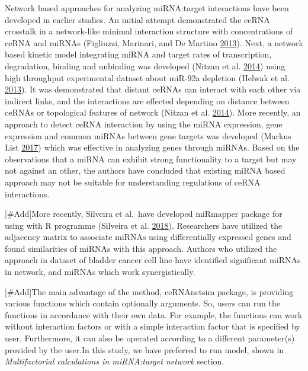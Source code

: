 \documentclass[a4,center,fleqn]{NAR}
\begin{document}
Network based approaches for analyzing miRNA:target interactions have
been developed in earlier studies. An initial attempt demonstrated the
ceRNA crosstalk in a network-like minimal interaction structure with
concentrations of ceRNA and miRNAs (Figliuzzi, Marinari, and De Martino
\protect\hyperlink{ref-figliuzzi_micrornas_2013}{2013}). Next, a network
based kinetic model integrating miRNA and target rates of transcription,
degradation, binding and unbinding was developed (Nitzan et al.
\protect\hyperlink{ref-nitzan_interactions_2014}{2014}) using high
throughput experimental dataset about miR-92a depletion (Helwak et al.
\protect\hyperlink{ref-helwak_mapping_2013}{2013}). It was demonstrated
that distant ceRNAs can interact with each other via indirect links, and
the interactions are effected depending on distance between ceRNAs or
topological features of network (Nitzan et al.
\protect\hyperlink{ref-nitzan_interactions_2014}{2014}). More recently,
an approach to detect ceRNA interaction by using the miRNA expression,
gene expression and common miRNAs between gene targets was developed
(Markus List \protect\hyperlink{ref-markus_list_sponge_2017}{2017})
which was effective in analyzing genes through miRNAs. Based on the
observations that a miRNA can exhibit strong functionality to a target
but may not against an other, the authors have concluded that existing
miRNA based approach may not be suitable for understanding regulations
of ceRNA interactions.

{[}\#Add{]}More recently, Silveira et al.~have developed miRmapper
package for using with R programme (Silveira et al.
\protect\hyperlink{ref-da2018mirmapper}{2018}). Researchers have
utilized the adjacency matrix to associate miRNAs using differentially
expressed genes and found similarities of miRNAs with this approach.
Authors who utilized the approach in dataset of bladder cancer cell line
have identified significant miRNAs in network, and miRNAs which work
synergistically.

{[}\#Add{]}The main advantage of the method, ceRNAnetsim package, is
providing various functions which contain optionally arguments. So,
users can run the functions in accordance with their own data. For
example, the functions can work without interaction factors or with a
simple interaction factor that is specified by user. Furthermore, it can
also be operated according to a different parameter(s) provided by the
user.In this study, we have preferred to run model, shown in
\emph{Multifactorial calculations in miRNA:target network} section.
\end{document}
